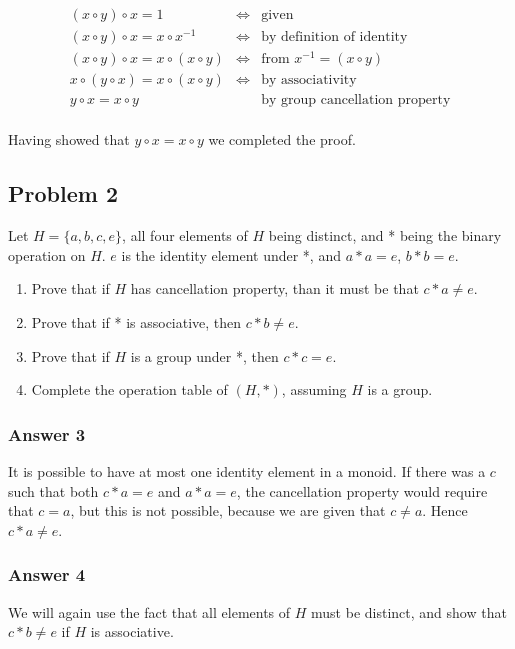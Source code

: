\documentclass[11pt]{article}
\begin{document}
\begin{equation*}
  \begin{array}{lll}
    (x \circ y) \circ x = 1                  & \iff &
    \textrm{given} \\
    (x \circ y) \circ x = x \circ x^{-1}      & \iff &
    \textrm{by definition of identity} \\
    (x \circ y) \circ x = x \circ (x \circ y) & \iff &
    \textrm{from $x^{-1} = (x \circ y)$} \\
    x \circ (y \circ x) = x \circ (x \circ y) & \iff &
    \textrm{by associativity} \\
    y \circ x = x \circ y                     &      &
    \textrm{by group cancellation property} \\
  \end{array}
\end{equation*}

Having showed that $y \circ x = x \circ y$ we completed the proof.

\subsection{Problem 2}
\label{sec-1-2}

Let $H = \{a, b, c, e\}$, all four elements of $H$ being distinct, and *
being the binary operation on $H$.  $e$ is the identity element under *,
and $a*a=e$, $b*b=e$.

\begin{enumerate}
\item Prove that if $H$ has cancellation property, than it must be that $c*a \neq e$.
\item Prove that if * is associative, then $c*b \neq e$.
\item Prove that if $H$ is a group under *, then $c*c=e$.
\item Complete the operation table of $(H, *)$, assuming $H$ is a group.
\end{enumerate}

\subsubsection{Answer 3}
\label{sec-1-2-1}
It is possible to have at most one identity element in a monoid.  If there was
a $c$ such that both $c*a=e$ and $a*a=e$, the cancellation property would require
that $c=a$, but this is not possible, because we are given that $c \neq a$.
Hence $c*a \neq e$.
\subsubsection{Answer 4}
\label{sec-1-2-2}
We will again use the fact that all elements of $H$ must be distinct, and show
that $c*b \neq e$ if $H$ is associative.
\end{document}
